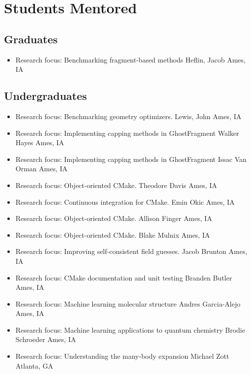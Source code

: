 \documentclass[11pt,a4paper,sans]{moderncv}
\begin{document}
\section{Students Mentored}

	\subsection{Graduates}
	\begin{itemize}
		\item{
			{Research focus: Benchmarking fragment-based methods}
			{Heflin, Jacob}
			{Ames, IA}
			{}{}
		}
	\end{itemize}
\subsection{Undergraduates}
\begin{itemize}
	\item{
		{Research focus: Benchmarking geometry optimizers.}
		{Lewis, John}
		{Ames, IA}
		{}{}
	}
	\item{
		{Research focus: Implementing capping methods in GhostFragment}
		{Walker Hayes}
		{Ames, IA}
		{}{}
	}
	\item{
		{Research focus: Implementing capping methods in GhostFragment}
		{Issac Van Orman}
		{Ames, IA}
		{}{}
	}
	\item{
		{Research focus: Object-oriented CMake.}
		{Theodore Davis}
		{Ames, IA}
		{}{}
	}
	\item{
		{Research focus: Continuous integration for CMake.}
		{Emin Okic}
		{Ames, IA}
		{}{}
	}
	\item{
		{Research focus: Object-oriented CMake.}
		{Allison Finger}
		{Ames, IA}
		{}{}
	}
	\item{
		{Research focus: Object-oriented CMake.}
		{Blake Mulnix}
		{Ames, IA}
		{}{}
	}
	\item{
		{Research focus: Improving self-consistent field guesses.}
		{Jacob Brunton}
		{Ames, IA}
		{}{}
	}
	\item{
		{Research focus: CMake documentation and unit testing}
		{Branden Butler}
		{Ames, IA}
		{}{}
	}
	\item{
		{Research focus: Machine learning molecular structure}
		{Andres Garcia-Alejo}
		{Ames, IA}
		{}{}
	}
	\item{
		{Research focus: Machine learning applications to quantum chemistry}
		{Brodie Schroeder}
		{Ames, IA}
		{}{}
	}
	\item{
		{Research focus: Understanding the many-body expansion}
		{Michael Zott}
		{Atlanta, GA}
		{}{}
	}
\end{itemize}
\end{document}
